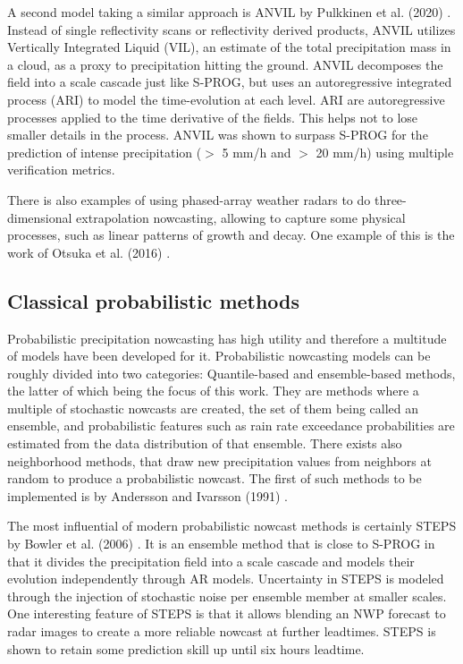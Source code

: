 A second model taking a similar approach is ANVIL by Pulkkinen et al. (2020) \cite{pulkkinen_nowcasting_2020}. Instead of single reflectivity scans or reflectivity derived products, ANVIL utilizes Vertically Integrated Liquid (VIL), an estimate of the total precipitation mass in a cloud, as a proxy to precipitation hitting the ground. ANVIL decomposes the field into a scale cascade just like S-PROG, but uses an autoregressive integrated process (ARI) to model the time-evolution at each level. ARI are autoregressive processes applied to the time derivative of the fields. This helps not to lose smaller details in the process. ANVIL was shown to surpass S-PROG for the prediction of intense precipitation ($>$ 5 mm/h and $>$ 20 mm/h) using multiple verification metrics. 

There is also examples of using phased-array weather radars to do three-dimensional extrapolation nowcasting, allowing to capture some physical processes, such as linear patterns of growth and decay. One example of this is the work of Otsuka et al. (2016) \cite{otsuka_precipitation_2016}. 


\subsection{Classical probabilistic methods}

Probabilistic precipitation nowcasting has high utility and therefore a multitude of models have been developed for it. 
Probabilistic nowcasting models can be roughly divided into two categories: Quantile-based and ensemble-based methods, the latter of which being the focus of this work. They are methods where a multiple of stochastic nowcasts are created, the set of them being called an ensemble, and probabilistic features such as rain rate exceedance probabilities are estimated from the data distribution of that ensemble.  
There exists also neighborhood methods, that draw new precipitation values from neighbors at random to produce a probabilistic nowcast. The first of such methods to be implemented is by Andersson and Ivarsson (1991) \cite{andersson_model_1991}. 


The most influential of modern probabilistic nowcast methods is certainly STEPS by Bowler et al. (2006) \cite{bowler_steps_2006}. It is an ensemble method that is close to S-PROG in that it divides the precipitation field into a scale cascade and models their evolution independently through AR models. Uncertainty in STEPS is modeled through the injection of stochastic noise per ensemble member at smaller scales. One interesting feature of STEPS is that it allows blending an NWP forecast to radar images to create a more reliable nowcast at further leadtimes. STEPS is shown to retain some prediction skill up until six hours leadtime. 

